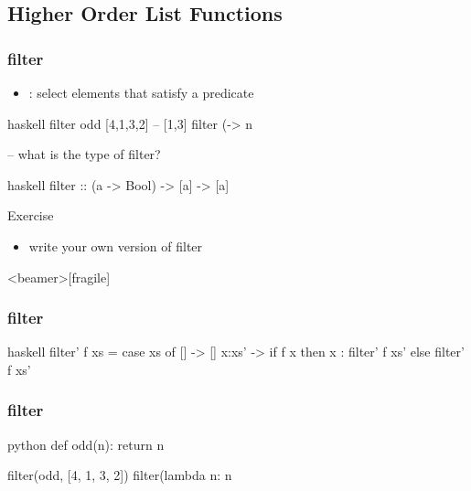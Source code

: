\documentclass[dvipsnames]{beamer}
\theoremstyle{plain}
\begin{document}
\subsection{Higher Order List Functions}

\begin{frame}[fragile]
  \frametitle{filter}

  \begin{itemize}
    \item {}: select elements that satisfy a predicate
  \end{itemize}

  \pause
  \begin{example}[Haskell]
    \begin{pygments}{haskell}
filter odd [4,1,3,2]                    -- [1,3]
filter (\n -> n %

-- what is the type of filter?
    \end{pygments}

    \pause
    \begin{pygments}{haskell}
filter :: (a -> Bool) -> [a] -> [a]
    \end{pygments}
  \end{example}

  \pause
  \begin{block}{Exercise}
    \begin{itemize}
      \item write your own version of filter
    \end{itemize}
  \end{block}
\end{frame}

\begin{frame}<beamer>[fragile]
  \frametitle{filter}

  \begin{example}[Haskell]
    \begin{pygments}{haskell}
filter' f xs =
    case xs of
      [] -> []
      x:xs' -> if f x
               then x : filter' f xs'
               else filter' f xs'
    \end{pygments}
  \end{example}
\end{frame}

\begin{frame}[fragile]
  \frametitle{filter}

  \begin{example}[Python]
    \begin{pygments}{python}
def odd(n):
    return n %

filter(odd, [4, 1, 3, 2])
filter(lambda n: n %
    \end{pygments}
  \end{example}
\end{frame}
\end{document}
